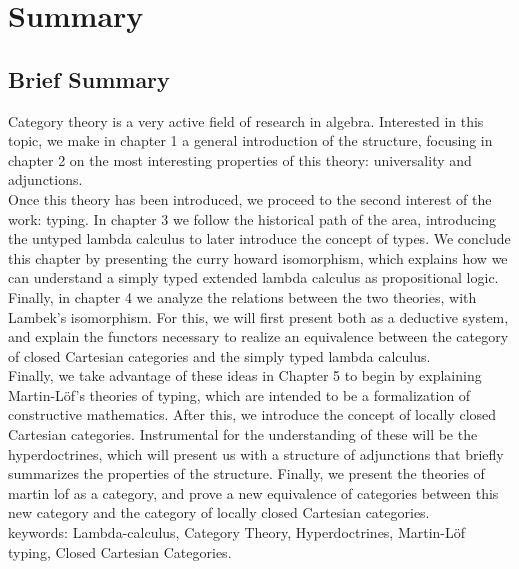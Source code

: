 
\newpage



\chapter*{Summary}
\section*{Brief Summary}
Category theory is a very active field of research in algebra. Interested in this topic, we make in chapter 1 a general introduction of the structure, focusing in chapter 2 on the most interesting properties of this theory: universality and adjunctions. \\

Once this theory has been introduced, we proceed to the second interest of the work: typing. In chapter 3 we follow the historical path of the area, introducing the untyped lambda calculus to later introduce the concept of types. We conclude this chapter by presenting the curry howard isomorphism, which explains how we can understand a simply typed extended lambda calculus as propositional logic.\\

Finally, in chapter 4 we analyze the relations between the two theories, with Lambek's isomorphism. For this, we will first present both as a deductive system, and explain the functors necessary to realize an equivalence between the category of closed Cartesian categories and the simply typed lambda calculus.\\

Finally, we take advantage of these ideas in Chapter 5 to begin by explaining Martin-L\"of's theories of typing, which are intended to be a formalization of constructive mathematics. After this, we introduce the concept of locally closed Cartesian categories. Instrumental for the understanding of these will be the hyperdoctrines, which will present us with a structure of adjunctions that briefly summarizes the properties of the structure. Finally, we present the theories of martin lof as a category, and prove a new equivalence of categories between this new category and the category of locally closed Cartesian categories. \\

{keywords: Lambda-calculus, Category Theory, Hyperdoctrines, Martin-L\"of typing, Closed Cartesian Categories.} 


